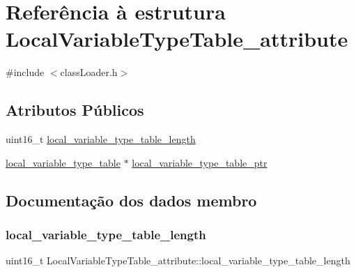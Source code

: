 \hypertarget{struct_local_variable_type_table__attribute}{}\section{Referência à estrutura Local\+Variable\+Type\+Table\+\_\+attribute}
\label{struct_local_variable_type_table__attribute}


{\ttfamily \#include $<$class\+Loader.\+h$>$}

\subsection*{Atributos Públicos}
\begin{DoxyCompactItemize}
\item 
uint16\+\_\+t \hyperlink{struct_local_variable_type_table__attribute_a920ce1a3072e20bb1bf7ac1087d4d0bd}{local\+\_\+variable\+\_\+type\+\_\+table\+\_\+length}
\item 
\hyperlink{structlocal__variable__type__table}{local\+\_\+variable\+\_\+type\+\_\+table} $\ast$ \hyperlink{struct_local_variable_type_table__attribute_af7140cde866901debb62cdc0ebd88483}{local\+\_\+variable\+\_\+type\+\_\+table\+\_\+ptr}
\end{DoxyCompactItemize}


\subsection{Documentação dos dados membro}
\hypertarget{struct_local_variable_type_table__attribute_a920ce1a3072e20bb1bf7ac1087d4d0bd}{}\label{struct_local_variable_type_table__attribute_a920ce1a3072e20bb1bf7ac1087d4d0bd} 
\subsubsection{\texorpdfstring{local\+\_\+variable\+\_\+type\+\_\+table\+\_\+length}{local\_variable\_type\_table\_length}}
{\footnotesize\ttfamily uint16\+\_\+t Local\+Variable\+Type\+Table\+\_\+attribute\+::local\+\_\+variable\+\_\+type\+\_\+table\+\_\+length}

